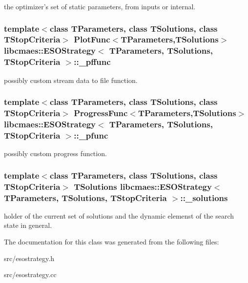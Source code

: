 the optimizer's set of static parameters, from inputs or internal. \hypertarget{classlibcmaes_1_1ESOStrategy_af2c9909de76f98e4b9c207bda577255d}{
\subsubsection[{\-\_\-pffunc}]{\setlength{\rightskip}{0pt plus 5cm}template$<$class T\-Parameters, class T\-Solutions, class T\-Stop\-Criteria$>$ Plot\-Func$<$T\-Parameters,T\-Solutions$>$ {\bf libcmaes\-::\-E\-S\-O\-Strategy}$<$ T\-Parameters, T\-Solutions, T\-Stop\-Criteria $>$\-::\-\_\-pffunc\hspace{0.3cm}{\ttfamily [protected]}}}\label{classlibcmaes_1_1ESOStrategy_af2c9909de76f98e4b9c207bda577255d}
possibly custom stream data to file function. \hypertarget{classlibcmaes_1_1ESOStrategy_a25d597189596f434a2530887fddea189}{
\subsubsection[{\-\_\-pfunc}]{\setlength{\rightskip}{0pt plus 5cm}template$<$class T\-Parameters, class T\-Solutions, class T\-Stop\-Criteria$>$ Progress\-Func$<$T\-Parameters,T\-Solutions$>$ {\bf libcmaes\-::\-E\-S\-O\-Strategy}$<$ T\-Parameters, T\-Solutions, T\-Stop\-Criteria $>$\-::\-\_\-pfunc\hspace{0.3cm}{\ttfamily [protected]}}}\label{classlibcmaes_1_1ESOStrategy_a25d597189596f434a2530887fddea189}
possibly custom progress function. \hypertarget{classlibcmaes_1_1ESOStrategy_a8fe0f8dc2201951e9e4ed2768b5a09ab}{
\subsubsection[{\-\_\-solutions}]{\setlength{\rightskip}{0pt plus 5cm}template$<$class T\-Parameters, class T\-Solutions, class T\-Stop\-Criteria$>$ T\-Solutions {\bf libcmaes\-::\-E\-S\-O\-Strategy}$<$ T\-Parameters, T\-Solutions, T\-Stop\-Criteria $>$\-::\-\_\-solutions\hspace{0.3cm}{\ttfamily [protected]}}}\label{classlibcmaes_1_1ESOStrategy_a8fe0f8dc2201951e9e4ed2768b5a09ab}
holder of the current set of solutions and the dynamic elemenst of the search state in general. 

The documentation for this class was generated from the following files\-:\begin{DoxyCompactItemize}
\item 
src/esostrategy.\-h\item 
src/esostrategy.\-cc\end{DoxyCompactItemize}
